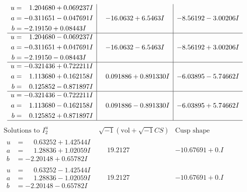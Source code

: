\documentclass[1p]{elsarticle_modified}
\theoremstyle{definition}
\newcommand{\I}{\sqrt{-1}}
\begin{document}
$$\begin{array}{c|c|c}
\begin{aligned}
u &= \phantom{-}1.204680 + 0.069237 I \\
a &= -0.311651 - 0.047691 I \\
b &= -2.19150 + 0.08443 I\end{aligned}
 & -16.0632 + 6.5463 I & -8.56192 - 3.00206 I \\ \hline\begin{aligned}
u &= \phantom{-}1.204680 - 0.069237 I \\
a &= -0.311651 + 0.047691 I \\
b &= -2.19150 - 0.08443 I\end{aligned}
 & -16.0632 - 6.5463 I & -8.56192 + 3.00206 I \\ \hline\begin{aligned}
u &= -0.321436 + 0.722211 I \\
a &= \phantom{-}1.113680 + 0.162158 I \\
b &= \phantom{-}0.125852 - 0.871897 I\end{aligned}
 & \phantom{-}0.091886 + 0.891330 I & -6.03895 - 5.74662 I \\ \hline\begin{aligned}
u &= -0.321436 - 0.722211 I \\
a &= \phantom{-}1.113680 - 0.162158 I \\
b &= \phantom{-}0.125852 + 0.871897 I\end{aligned}
 & \phantom{-}0.091886 - 0.891330 I & -6.03895 + 5.74662 I\\
 \hline 
 \end{array}$$\newpage$$\begin{array}{c|c|c}  
\text{Solutions to }I^u_{2}& \I (\text{vol} + \sqrt{-1}CS) & \text{Cusp shape}\\
 \hline 
\begin{aligned}
u &= \phantom{-}0.63252 + 1.42544 I \\
a &= \phantom{-}1.28836 + 1.02059 I \\
b &= -2.20148 + 0.65782 I\end{aligned}
 & \phantom{-}19.2127\phantom{ +0.000000I} & -10.67691 + 0. I\phantom{ +0.000000I} \\ \hline\begin{aligned}
u &= \phantom{-}0.63252 - 1.42544 I \\
a &= \phantom{-}1.28836 - 1.02059 I \\
b &= -2.20148 - 0.65782 I\end{aligned}
 & \phantom{-}19.2127\phantom{ +0.000000I} & -10.67691 + 0. I\phantom{ +0.000000I} \\ \hline\begin{aligned}

\end{aligned}
\end{array}$$
\end{document}
